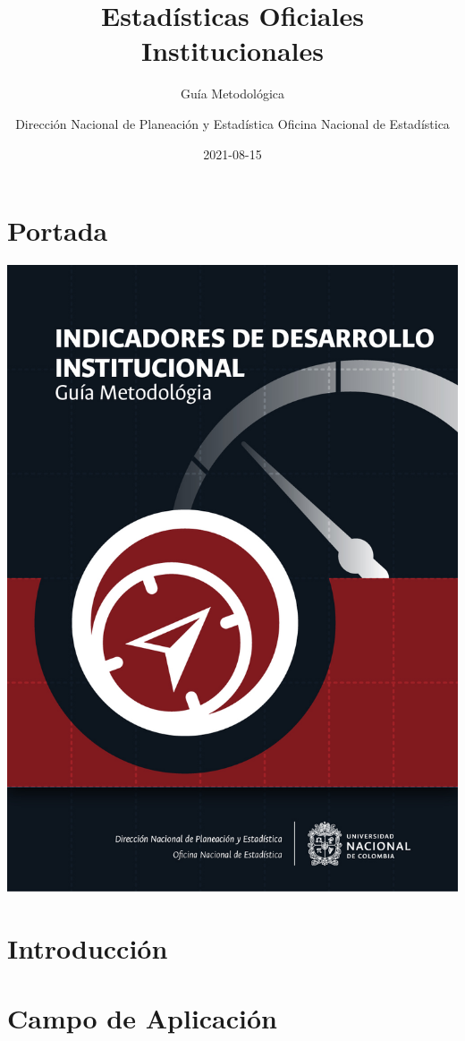 \documentclass[
]{book}
\title{Estadísticas Oficiales Institucionales}
\subtitle{Guía Metodológica}
\author{Dirección Nacional de Planeación y Estadística Oficina Nacional de Estadística}
\date{2021-08-15}
\begin{document}
\maketitle

{
\setcounter{tocdepth}{1}
\tableofcontents
}
\hypertarget{portada}{%
\chapter*{Portada}\label{portada}}

\begin{center}\includegraphics[width=0.75\linewidth,]{imagenes/Portada} \end{center}

\hypertarget{intro}{%
\chapter{\texorpdfstring{\textbf{Introducción}}{Introducción}}\label{intro}}

\hypertarget{campo-de-aplicaciuxf3n}{%
\chapter{\texorpdfstring{\textbf{Campo de Aplicación}}{Campo de Aplicación}}\label{campo-de-aplicaciuxf3n}}
\end{document}
